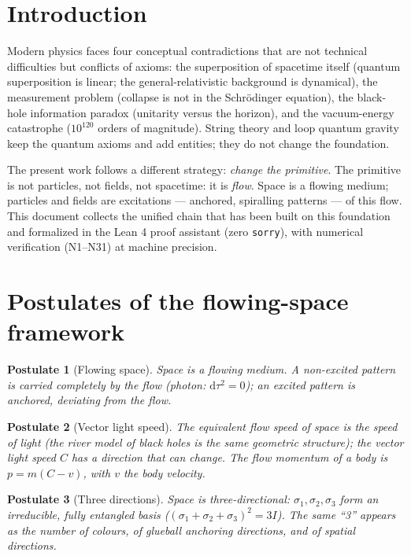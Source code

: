 \documentclass[aps,prd,preprint,superscriptaddress,amsmath,amssymb]{revtex4-2}
\newtheorem{postulate}{Postulate}[section]
\begin{document}
\section{Introduction}
\label{sec:intro}

Modern physics faces four conceptual contradictions that are not technical
difficulties but conflicts of axioms: the superposition of spacetime itself
(quantum superposition is linear; the general-relativistic background is
dynamical), the measurement problem (collapse is not in the Schr\"odinger
equation), the black-hole information paradox (unitarity versus the
horizon), and the vacuum-energy catastrophe ($10^{120}$ orders of
magnitude).  String theory and loop quantum gravity keep the quantum
axioms and add entities; they do not change the foundation.

The present work follows a different strategy: \emph{change the primitive}.
The primitive is not particles, not fields, not spacetime: it is
\emph{flow}.  Space is a flowing medium; particles and fields are
excitations --- anchored, spiralling patterns --- of this flow.  This
document collects the unified chain that has been built on this foundation \cite{ProjectionPhysics}
and formalized in the Lean 4 proof assistant (zero \texttt{sorry}), with numerical
verification (N1--N31) at machine precision.

\section{Postulates of the flowing-space framework}
\label{sec:postulates}

\begin{postulate}[Flowing space]
Space is a flowing medium.  A non-excited pattern is carried completely by
the flow (photon: $\mathrm d\tau^2=0$); an excited pattern is anchored,
deviating from the flow.
\end{postulate}

\begin{postulate}[Vector light speed]
The equivalent flow speed of space is the speed of light (the river model of black holes \cite{hamilton2008river} is the same geometric structure); the vector light
speed $C$ has a direction that can change.  The flow momentum of a body is
$p = m(C-v)$, with $v$ the body velocity.
\end{postulate}

\begin{postulate}[Three directions]
Space is three-directional: $\sigma_1,\sigma_2,\sigma_3$ form an
irreducible, fully entangled basis ($(\sigma_1+\sigma_2+\sigma_3)^2=3I$).
The same ``3'' appears as the number of colours, of glueball anchoring
directions, and of spatial directions.
\end{postulate}
\end{document}
